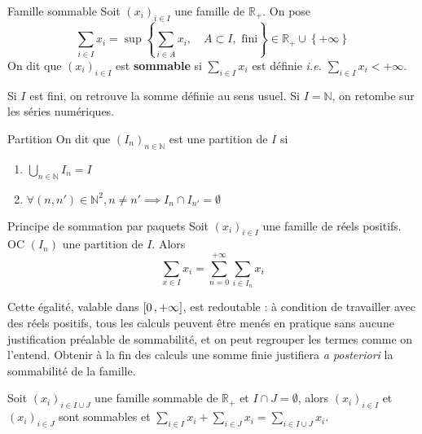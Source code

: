     \begin{defi}{Famille sommable}{}
        Soit $(x_i)_{i \in I}$ une famille de $\mathbb{R}_+$. On pose 
        \[ \sum_{i \in I} x_i = \sup\left\{\sum_{i \in A} x_i , \quad A \subset I, \text{ fini}\right\} \in \mathbb{R}_+ \cup \left\{+\infty\right\} \]   
        On dit que $(x_i)_{i \in I}$ est \textbf{sommable} si $\sum_{i \in I} x_i$ est définie \textit{i.e.} $\sum_{i \in I} x_i < + \infty$.
    \end{defi}

    Si $I$ est fini, on retrouve la somme définie au sens usuel. Si $I = \mathbb{N}$, on retombe sur les séries numériques.

    \begin{defi}{Partition}{}
        On dit que $(I_n)_{n \in \mathbb{N}}$ est une partition de $I$ si 
        \begin{enumerate}
            \item $\bigcup_{n \in \mathbb{N}} I_n = I$
            \item $\forall (n,n') \in \mathbb{N}^2, n \neq n' \implies I_n \cap I_{n'} = \emptyset$
        \end{enumerate}
    \end{defi}

    \begin{prop}{Principe de sommation par paquets}{}
        Soit $(x_i)_{i \in I}$ une famille de réels positifs. OC $(I_n)$ une partition de $I$. Alors 
        \[ \sum_{x \in I} x_i = \sum_{n=0}^{+\infty} \sum_{i \in I_n} x_i  \]  
    \end{prop}

    Cette égalité, valable dans $\left[ 0 \, , +\infty \right]$, est redoutable : à condition de travailler avec des réels positifs, tous les calculs peuvent être menés en pratique sans aucune justification préalable de sommabilité, et on peut regrouper les termes comme on l’entend. Obtenir à la fin des calculs une somme finie justifiera \textit{a posteriori} la sommabilité de la famille. 

    \begin{lem}{}{}
        Soit $(x_i)_{i \in I \cup J}$ une famille sommable de $\mathbb{R}_+$ et $I \cap J = \emptyset$, alors $(x_i)_{i \in I}$ et $(x_i)_{i \in J}$ sont sommables et $\sum_{i \in I} x_i + \sum_{i \in J} x_i = \sum_{i \in I \cup J} x_i$.
    \end{lem}

